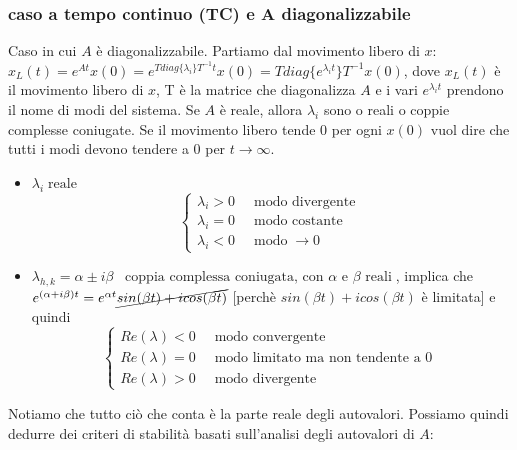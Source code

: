 \subsubsection*{caso a tempo continuo (TC) e A diagonalizzabile}
Caso in cui $A$ è diagonalizzabile.\newline
\newline
Partiamo dal movimento libero di $x$: $x_L (t) = e^{At} x(0) = e^{T diag\{\lambda_i\}T^{-1} t}x(0) = T diag\{e^{\lambda_i t}\}T^{-1}x(0)$, dove $x_L(t)$ è il movimento libero di $x$, T è la matrice che diagonalizza $A$ e i vari $e^{\lambda_it}$ prendono il nome di modi del sistema.\newline
\newline
Se $A$ è reale, allora $\lambda_i$ sono o reali o coppie complesse coniugate.\newline
\newline
Se il movimento libero tende $0$ per ogni $x(0)$ vuol dire che tutti i modi devono tendere a $0$ per $t \rightarrow \infty$.
\begin{itemize}
    \item $\lambda_i \; \text{reale}$
    \[
        \begin{cases}
            \lambda_i >0 \;\;& \text{modo divergente}\;\\
            \lambda_i =0 \;\;& \text{modo costante}\;\\
            \lambda_i <0 \;\;& \text{modo}\;\rightarrow  0
        \end{cases}
    \]
    \item $\lambda_{h,k} = \alpha \pm i \beta \;\;\;\text{coppia complessa coniugata, con $\alpha$ e $\beta$ reali}\;$, implica che $e^{(\alpha + i \beta)t} = e^{\alpha t} \cancel{sin(\beta t) + i cos(\beta t)}$ [perchè $sin(\beta t) + i cos(\beta t)$ è limitata] e quindi
    \[
        \begin{cases}
            Re(\lambda) < 0 \;\; & \text{modo convergente}\;\\
            Re(\lambda) = 0 \;\; & \text{modo limitato ma non tendente a $0$}\;\\
            Re(\lambda) > 0 \;\; & \text{modo divergente}\;
        \end{cases}
    \]
\end{itemize}
Notiamo che tutto ciò che conta è la parte reale degli autovalori.\newline
\newline
Possiamo quindi dedurre dei criteri di stabilità basati sull'analisi degli autovalori di $A$:
